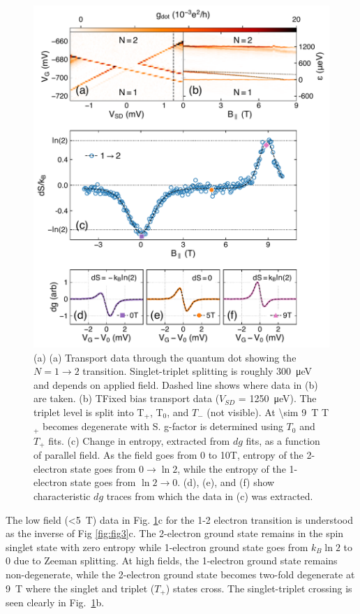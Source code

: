 \documentclass[twocolumn,showpacs,preprintnumbers,amsmath,amssymb,pra,aps,superscriptaddress]{revtex4-1}
\begin{document}
\begin{figure}
        \includegraphics[width=1.0\columnwidth]{../figures/figure_4.pdf}
        \caption{\label{fig:fig4}(a) (a) Transport data through the quantum dot showing the $N=1 \rightarrow 2$ transition. Singlet-triplet splitting is roughly \SI{300}{\micro\electronvolt} and depends on applied field. Dashed line shows where data in (b) are taken. (b) TFixed bias transport data ($V_{SD}$ = \SI{1250}{\micro\electronvolt}). The triplet level is split into T$_+$, T$_0$, and $T_{-}$ (not visible). At \SI[input-protect-tokens]{\sim 9}{\tesla} T$_+$ becomes degenerate with S. g-factor is determined using $T_0$ and $T_+$ fits. (c) Change in entropy, extracted from $dg$ fits, as a function of parallel field. As the field goes from 0 to 10T, entropy of the 2-electron state goes from $0  \rightarrow \ln{2}$, while the entropy of the 1-electron state goes from $\ln{2} \rightarrow 0$. (d), (e), and (f) show characteristic $dg$ traces from which the data in (c) was extracted.}
\end{figure}

The low field (\SI{<5}{\tesla}) data in Fig. \ref{fig:fig4}c for the 1-2 electron transition is understood as the inverse of Fig \ref{fig:fig3}c. The 2-electron ground state remains in the spin singlet state with zero entropy while 1-electron ground state goes from $k_B\ln{2}$ to $0$ due to Zeeman splitting. At high fields, the 1-electron ground state remains non-degenerate, while the 2-electron ground state becomes two-fold degenerate at \SI{9}{\tesla} where the singlet and triplet ($T_+$) states cross. The singlet-triplet crossing is seen clearly in Fig.~\ref{fig:fig4}b. 
\end{document}
